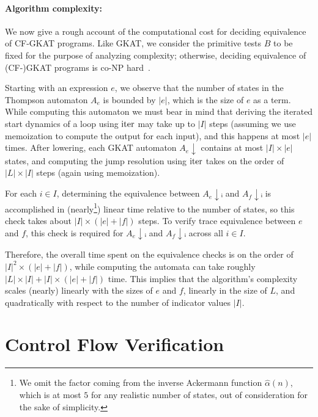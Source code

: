\paragraph*{Algorithm complexity:}
We now give a rough account of the computational cost for deciding equivalence of CF-GKAT programs.
Like GKAT, we consider the primitive tests \(B\) to be fixed for the purpose of analyzing complexity; otherwise, deciding equivalence of (CF-)GKAT programs is co-NP hard~\cite{Smolka_Foster_Hsu_Kappé_Kozen_Silva_2020}.

Starting with an expression \(e\), we observe that the number of states in the Thompson automaton \(A_e\) is bounded by \(|e|\), which is the size of $e$ as a term.
While computing this automaton we must bear in mind that deriving the iterated start dynamics of a loop using $\mathrm{iter}$ may take up to $|I|$ steps (assuming we use memoization to compute the output for each input), and this happens at most $|e|$ times.
After lowering, each GKAT automaton \(A_e\!↓\) contains at most \(|I|×|e|\) states, and computing the jump resolution using $\mathrm{iter}$ takes on the order of $|L| \times |I|$ steps (again using memoization). 

For each \(i ∈ I\), determining the equivalence between \(A_e\!↓ᵢ\) and \(A_f\!↓ᵢ\) is accomplished in (nearly\footnote{We omit the factor coming from the inverse Ackermann function $\hat{\alpha}(n)$, which is at most $5$ for any realistic number of states, out of consideration for the sake of simplicity.}) linear time relative to the number of states, so this check takes about \(|I|×(|e|+|f|)\) steps.
To verify trace equivalence between \(e\) and \(f\), this check is required for \(A_e\!↓ᵢ\) and \(A_f\!↓ᵢ\) across all \(i∈I\). 

Therefore, the overall time spent on the equivalence checks is on the order of \(|I|^2 × (|e|+|f|)\), while computing the automata can take roughly $|L| × |I| + |I| × (|e| + |f|)$ time. 
This implies that the algorithm's complexity scales (nearly) linearly with the sizes of \(e\) and \(f\), linearly in the size of $L$, and quadratically with respect to the number of indicator values \(|I|\).


\section{Control Flow Verification}%
\label{sec:experiments}


